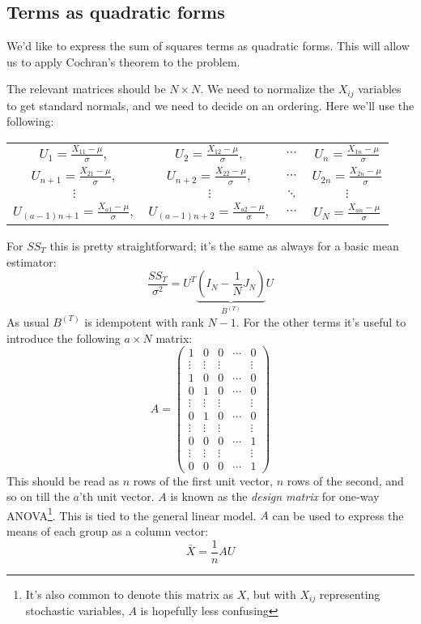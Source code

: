 \documentclass[12pt, a4paper]{article}
\begin{document}
\subsection{Terms as quadratic forms}
We'd like to express the sum of squares terms as quadratic forms. This will allow us to apply Cochran's theorem to the problem.\par
The relevant matrices should be $N\times N$. We need to normalize the $X_{ij}$ variables to get standard normals, and we need to decide on an ordering. Here we'll use the following:
\begin{center}
\begin{tabular}{*4{c}}
$U_1=\frac{X_{11}-\mu}{\sigma},$ & $U_2=\frac{X_{12}-\mu}{\sigma},$	& $\cdots$ & $U_n=\frac{X_{1n}-\mu}{\sigma}$ \\
$U_{n+1}=\frac{X_{21}-\mu}{\sigma},$ &	$U_{n+2}=\frac{X_{22}-\mu}{\sigma},$		& $\cdots$	& $U_{2n}=\frac{X_{2n}-\mu}{\sigma}$ \\
$\vdots$ & $\vdots$ & $\ddots$ & $\vdots$ \\
$U_{(a-1)n+1}=\frac{X_{a1}-\mu}{\sigma},$ &	$U_{(a-1)n+2}=\frac{X_{a2}-\mu}{\sigma},$		& $\cdots$	& $U_{N}=\frac{X_{an}-\mu}{\sigma}$ \\
\end{tabular}
\end{center}
For $SS_T$ this is pretty straightforward; it's the same as always for a basic mean estimator:
\begin{equation}
\frac{SS_T}{\sigma^2}=U^T\underbrace{\left(I_N-\frac{1}{N}J_N\right)}_{B^{(T)}}U
\end{equation}
As usual $B^{(T)}$ is idempotent with rank $N-1$. For the other terms it's useful to introduce the following $a\times N$ matrix:
\begin{equation}
\label{designmatrix}
A=\begin{pmatrix}
1 & 0 & 0 & \cdots & 0 \\
\vdots & \vdots & \vdots & & \vdots \\
1 & 0 & 0 & \cdots & 0 \\
0 & 1 & 0 & \cdots & 0 \\
\vdots & \vdots & \vdots & & \vdots \\
0 & 1 & 0 & \cdots & 0 \\
\vdots & \vdots & \vdots & & \vdots \\
0 & 0 & 0 & \cdots & 1 \\
\vdots & \vdots & \vdots & & \vdots \\
0 & 0 & 0 & \cdots & 1
\end{pmatrix}
\end{equation}
This should be read as $n$ rows of the first unit vector, $n$ rows of the second, and so on till the $a$'th unit vector. $A$ is known as the \textit{design matrix} for one-way ANOVA\footnote{It's also common to denote this matrix as $X$, but with $X_{ij}$ representing stochastic variables, $A$ is hopefully less confusing}. This is tied to the general linear model. $A$ can be used to express the means of each group as a column vector:
\begin{equation}
\bar{X}=\frac{1}{n}AU
\end{equation}
\end{document}
